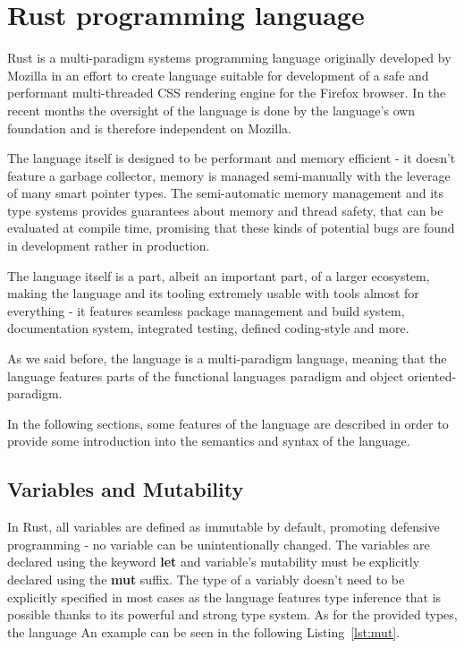 \section{Rust programming language}
\label{sec:rust}
Rust is a multi-paradigm systems programming language originally developed by Mozilla\cite{rust_authorship} in an effort to create language suitable for development of a safe and performant multi-threaded CSS rendering engine for the Firefox browser\cite{servo}.
In the recent months the oversight of the language is done by the language's own foundation and is therefore independent on Mozilla\cite{rust_foundation}.

The language itself is designed to be performant and memory efficient - it doesn't feature a garbage collector, memory is managed semi-manually with the leverage of many smart pointer types.
The semi-automatic memory management and its type systems provides guarantees about memory and thread safety, that can be evaluated at compile time, promising that these kinds of potential bugs are found in development rather in production.


The language itself is a part, albeit an important part, of a larger ecosystem, making the language and its tooling extremely usable with tools almost for everything - it features seamless package management and build system, documentation system, integrated testing, defined coding-style and more.

As we said before, the language is a multi-paradigm language, meaning that the language features parts of the functional languages paradigm and object oriented-paradigm.


In the following sections, some features of the language are described in order to provide some introduction into the semantics and syntax of the language.
\subsection{Variables and Mutability}
\label{subsec:var_mut}
In Rust, all variables are defined as immutable by default, promoting defensive programming - no variable can be unintentionally changed.
The variables are declared using the keyword \textbf{let} and variable's mutability must be explicitly declared using the \textbf{mut} suffix.
The type of a variably doesn't need to be explicitly specified in most cases as the language features type inference that is possible thanks to its powerful and strong type system.
As for the provided types, the language
An example can be seen in the following Listing~\ref{lst:mut}.


